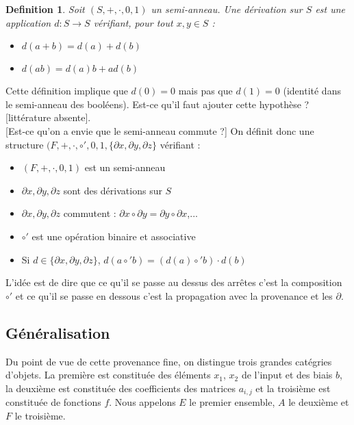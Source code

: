 \documentclass[11pt,a4paper]{article}
\newtheorem{definition}{Definition}
\begin{document}
	\begin{definition}
	
		Soit $(S,+,\cdot,0,1)$ un semi-anneau. Une dérivation sur $S$ est une application $d:S \to S$ vérifiant, pour tout $x,y \in S$ :
		\begin{itemize}
		 	\item $d(a+b)=d(a)+d(b)$
		 	\item $d(ab)=d(a)b+ad(b)$
		\end{itemize}

	\end{definition}
	
	Cette définition implique que $d(0)=0$ mais pas que $d(1)=0$ (identité dans le semi-anneau des booléens). Est-ce qu'il faut ajouter cette hypothèse ? [littérature absente].
	\\
	
	[Est-ce qu'on a envie que le semi-anneau commute ?]
	On définit donc une structure $(F,+,\cdot,\circ',0,1,\{\partial x, \partial y,\partial z \} $ vérifiant :
	\begin{itemize}
	
		\item $(F,+,\cdot,0,1)$ est un semi-anneau
		
		\item $\partial x, \partial y, \partial z$ sont des dérivations sur $S$
		
		\item $\partial x, \partial y, \partial z$ commutent : $\partial x \circ \partial y = \partial y \circ \partial x$,...
		
		\item $\circ'$ est une opération binaire et associative
		
		\item Si $d \in \{\partial x, \partial y,\partial z \}$, $d(a \circ' b)=(d(a)\circ'b)\cdot d(b)$
	
	\end{itemize}
	
	L'idée est de dire que ce qu'il se passe au dessus des arrêtes c'est la composition $\circ'$ et ce qu'il se passe en dessous c'est la propagation avec la provenance et les $\partial$.

	\subsection{Généralisation}

	Du point de vue de cette provenance fine, on distingue trois grandes catégries d'objets. La première est constituée des éléments $x_1$, $x_2$ de l'input et des biais $b$, la deuxième est constituée des coefficients des matrices $a_{i,j}$ et la troisième est constituée de fonctions $f$. Nous appelons $E$ le premier ensemble, $A$ le deuxième et $F$ le troisième.
	
\end{document}

